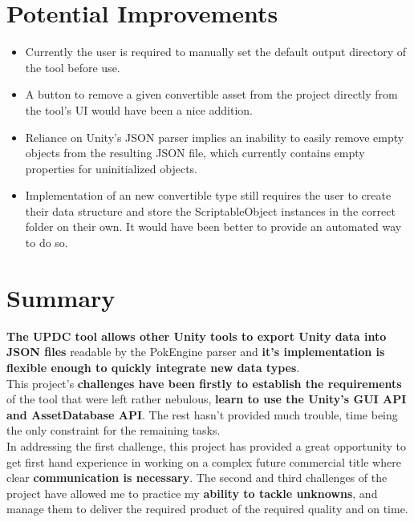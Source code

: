 \documentclass[12pt,a4paper]{article}
\begin{document}
\section{Potential Improvements}
\begin{itemize}
\item Currently the user is required to manually set the default output directory of the tool before use.
\item A button to remove a given convertible asset from the project directly from the tool's UI would have been a nice addition.
\item Reliance on Unity's JSON parser implies an inability to easily remove empty objects from the resulting JSON file, which currently contains empty properties for uninitialized objects.
\item Implementation of an new convertible type still requires the user to create their data structure and store the ScriptableObject instances in the correct folder on their own. It would have been better to provide an automated way to do so.
\end{itemize}
\newpage

\section{Summary}
\textbf{The UPDC tool allows other Unity tools to export Unity data into JSON files} readable by the PokEngine parser and \textbf{it's implementation is flexible enough to quickly integrate new data types}.\\
This project's \textbf{challenges have been firstly to establish the requirements} of the tool that were left rather nebulous, \textbf{learn to use the Unity's GUI API and AssetDatabase API}. The rest hasn't provided much trouble, time being the only constraint for the remaining tasks.\\
In addressing the first challenge, this project has provided a great opportunity to get first hand experience in working on a complex future commercial title where clear \textbf{communication is necessary}.
The second and third challenges of the project have allowed me to practice my \textbf{ability to tackle unknowns}, and manage them to deliver the required product of the required quality and on time.
\end{document}
